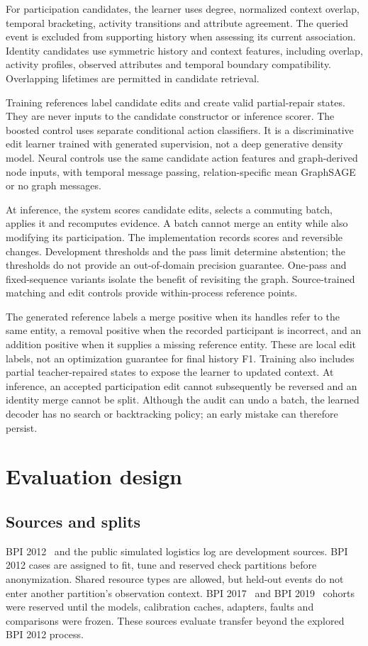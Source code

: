 \documentclass[11pt]{article}
\begin{document}
For participation candidates, the learner uses degree, normalized context overlap, temporal bracketing, activity transitions and attribute agreement. The queried event is excluded from supporting history when assessing its current association. Identity candidates use symmetric history and context features, including overlap, activity profiles, observed attributes and temporal boundary compatibility. Overlapping lifetimes are permitted in candidate retrieval.

Training references label candidate edits and create valid partial-repair states. They are never inputs to the candidate constructor or inference scorer. The boosted control uses separate conditional action classifiers. It is a discriminative edit learner trained with generated supervision, not a deep generative density model. Neural controls use the same candidate action features and graph-derived node inputs, with temporal message passing, relation-specific mean GraphSAGE or no graph messages.

At inference, the system scores candidate edits, selects a commuting batch, applies it and recomputes evidence. A batch cannot merge an entity while also modifying its participation. The implementation records scores and reversible changes. Development thresholds and the pass limit determine abstention; the thresholds do not provide an out-of-domain precision guarantee. One-pass and fixed-sequence variants isolate the benefit of revisiting the graph. Source-trained matching and edit controls provide within-process reference points.

The generated reference labels a merge positive when its handles refer to the same entity, a removal positive when the recorded participant is incorrect, and an addition positive when it supplies a missing reference entity. These are local edit labels, not an optimization guarantee for final history F1. Training also includes partial teacher-repaired states to expose the learner to updated context. At inference, an accepted participation edit cannot subsequently be reversed and an identity merge cannot be split. Although the audit can undo a batch, the learned decoder has no search or backtracking policy; an early mistake can therefore persist.

\section{Evaluation design}
\subsection{Sources and splits}
BPI 2012~\cite{bpi2012} and the public simulated logistics log are development sources. BPI 2012 cases are assigned to fit, tune and reserved check partitions before anonymization. Shared resource types are allowed, but held-out events do not enter another partition's observation context. BPI 2017~\cite{bpi2017} and BPI 2019~\cite{bpi2019} cohorts were reserved until the models, calibration caches, adapters, faults and comparisons were frozen. These sources evaluate transfer beyond the explored BPI 2012 process.
\end{document}
